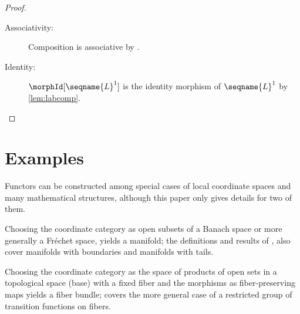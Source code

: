\documentclass{article}
\begin{document}
\begin{theorem}
\begin{proof}
\begin{description}
\item[Associativity:]
Composition is associative by .

\item[Identity:]
$\morphId[{\seqname{L}^1}]$ is the identity morphism of $\seqname{L}^1$
by \cref{lem:labcomp}.

\end{description}
\end{proof}
\end{theorem}

\section{Examples}
{
  \showlabelsinline
  \label{sec:ex}
}
\label{Examples}
Functors can be constructed among special cases of local coordinate
spaces and many mathematical structures, although this paper only gives
details for two of them.

\begin{example}[Manifolds]
Choosing the coordinate category as open subsets of a Banach space or
more generally a Fr\'echet space, yields a manifold;
the definitions and results of
, also cover manifolds with boundaries and
manifolds with tails.
\end{example}

\begin{example}
Choosing the coordinate category as the space of products of open sets
in a topological space (base) with a fixed fiber and the morphisms as
fiber-preserving maps yields a fiber bundle;  covers
the more general case of a restricted group of transition functions on
fibers.
\end{example}
\end{document}
